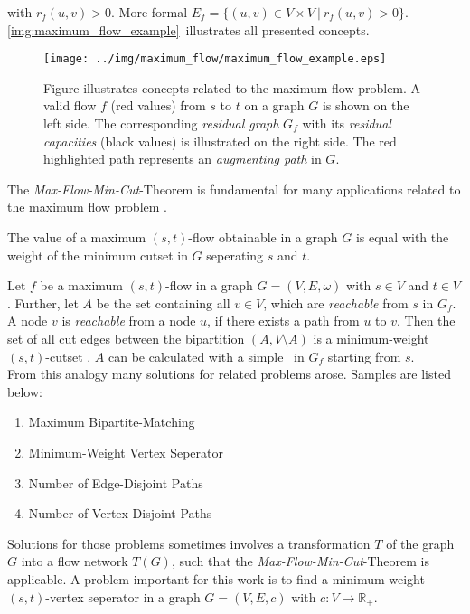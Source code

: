 with $r_f(u,v) > 0$. More formal $E_f = \{(u,v) \in V \times V\ |\ r_f(u,v) > 0\}$.
\autoref{img:maximum_flow_example}~illustrates all presented concepts. \\
\begin{figure}
\centering
\texttt{[image: ../img/maximum\_flow/maximum\_flow\_example.eps]}
\caption{Figure illustrates concepts related to the maximum flow problem. A valid flow $f$ 
(red values) from $s$ to $t$ on a graph $G$ is shown on the left side. The corresponding
\emph{residual graph} $G_f$ with its \emph{residual capacities} (black values) 
is illustrated on the right side. The red highlighted path represents an \emph{augmenting path}
in $G$.}
\label{img:maximum_flow_example}
\end{figure}
The \emph{Max-Flow-Min-Cut}-Theorem is fundamental for many applications related to the maximum
flow problem \cite{ford1956maximal}.

\begin{theorem}
The value of a maximum $(s,t)$-flow obtainable in a graph $G$ is equal with the weight
of the minimum cutset in $G$ seperating $s$ and $t$.
\end{theorem}

Let $f$ be a maximum $(s,t)$-flow in a graph $G = (V,E,\omega)$ with $s \in V$ and $t \in V$. 
Further, let $A$ be the set containing all $v \in V$, which are \emph{reachable} from $s$
in $G_f$. A node $v$ is \emph{reachable} from a node $u$, if there exists a path from $u$
to $v$. Then the set of all cut edges between the bipartition $(A,V\setminus A)$ 
is a minimum-weight $(s,t)$-cutset \cite{ford2015flows}. $A$ can be calculated with a simple \BFS~in $G_f$ starting
from $s$. \\
From this analogy many solutions for related problems arose. Samples are listed below:
\begin{enumerate}
\item Maximum Bipartite-Matching
\item Minimum-Weight Vertex Seperator
\item Number of Edge-Disjoint Paths
\item Number of Vertex-Disjoint Paths
\end{enumerate}
Solutions for those problems sometimes involves a transformation $T$ of the graph $G$
into a flow network $T(G)$, such that the \emph{Max-Flow-Min-Cut}-Theorem is applicable. 
A problem important for this work is to find a minimum-weight $(s,t)$-vertex seperator
in a graph $G = (V,E,c)$ with $c: V \rightarrow \mathbb{R}_+$.

